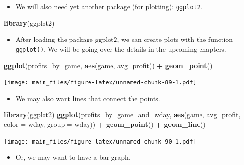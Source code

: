 \documentclass[
]{book}
\newenvironment{Shaded}{\begin{snugshade}}{\end{snugshade}}
\newcommand{\AttributeTok}[1]{\textcolor[rgb]{0.13,0.29,0.53}{#1}}
\newcommand{\FunctionTok}[1]{\textcolor[rgb]{0.13,0.29,0.53}{\textbf{#1}}}
\newcommand{\NormalTok}[1]{#1}
\newcommand{\SpecialCharTok}[1]{\textcolor[rgb]{0.81,0.36,0.00}{\textbf{#1}}}
\providecommand{\tightlist}{%
  \setlength{\itemsep}{0pt}\setlength{\parskip}{0pt}}
\begin{document}
\begin{itemize}
\tightlist
\item
  We will also need yet another package (for plotting): \texttt{ggplot2}.
\end{itemize}

\begin{Shaded}
\begin{Highlighting}[]
\FunctionTok{library}\NormalTok{(ggplot2)}
\end{Highlighting}
\end{Shaded}

\begin{itemize}
\tightlist
\item
  After loading the package ggplot2, we can create plots with the function \texttt{ggplot()}. We will be going over the details in the upcoming chapters.
\end{itemize}

\begin{Shaded}
\begin{Highlighting}[]
\FunctionTok{ggplot}\NormalTok{(profits\_by\_game, }\FunctionTok{aes}\NormalTok{(game, avg\_profit)) }\SpecialCharTok{+} \FunctionTok{geom\_point}\NormalTok{()}
\end{Highlighting}
\end{Shaded}

\texttt{[image: main\_files/figure-latex/unnamed-chunk-89-1.pdf]}

\begin{itemize}
\tightlist
\item
  We may also want lines that connect the points.
\end{itemize}

\begin{Shaded}
\begin{Highlighting}[]
\FunctionTok{library}\NormalTok{(ggplot2)}
\FunctionTok{ggplot}\NormalTok{(profits\_by\_game\_and\_wday, }\FunctionTok{aes}\NormalTok{(game, avg\_profit, }\AttributeTok{color =}\NormalTok{ wday, }\AttributeTok{group =}\NormalTok{ wday)) }\SpecialCharTok{+} \FunctionTok{geom\_point}\NormalTok{() }\SpecialCharTok{+} \FunctionTok{geom\_line}\NormalTok{()}
\end{Highlighting}
\end{Shaded}

\texttt{[image: main\_files/figure-latex/unnamed-chunk-90-1.pdf]}

\begin{itemize}
\tightlist
\item
  Or, we may want to have a bar graph.
\end{itemize}
\end{document}
